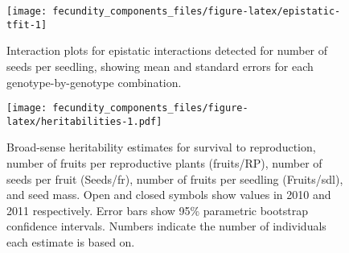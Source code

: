 \documentclass[
]{article}
\begin{document}
\newpage

\begin{figure}

{\centering \texttt{[image: fecundity\_components\_files/figure-latex/epistatic-tfit-1]} 

}

\caption[Epistatic interactions for number of seeds/seedling]{Interaction plots for epistatic interactions detected for number of seeds per seedling, showing mean and standard errors for each genotype-by-genotype combination.}\label{fig:epistatic-tfit}
\end{figure}

\newpage

\begin{figure}
\centering
\texttt{[image: fecundity\_components\_files/figure-latex/heritabilities-1.pdf]}
\caption{\label{fig:heritabilities}Broad-sense heritability estimates for survival to reproduction, number of fruits per reproductive plants (fruits/RP), number of seeds per fruit (Seeds/fr), number of fruits per seedling (Fruits/sdl), and seed mass. Open and closed symbols show values in 2010 and 2011 respectively. Error bars show 95\% parametric bootstrap confidence intervals. Numbers indicate the number of individuals each estimate is based on.}
\end{figure}
\end{document}
